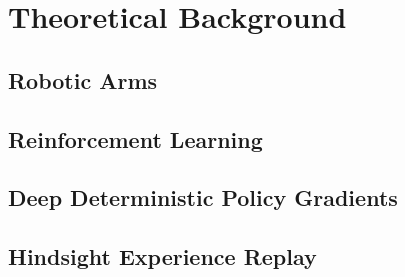 \chapter{Theoretical Background}



\section{Robotic Arms}




\section{Reinforcement Learning}




\section{Deep Deterministic Policy Gradients}




\section{Hindsight Experience Replay}
